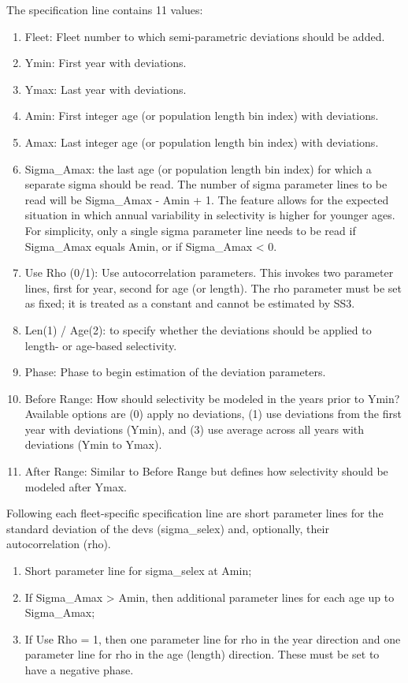 The specification line contains 11 values:
\begin{enumerate}
	\item Fleet: Fleet number to which semi-parametric deviations should be added.
	\item Ymin: First year with deviations.
	\item Ymax: Last year with deviations.
	\item Amin: First integer age (or population length bin index) with deviations.
	\item Amax: Last integer age (or population length bin index) with deviations.
	\item Sigma\_Amax: the last age (or population length bin index) for which a separate sigma should be read. The number of sigma parameter lines to be read will be Sigma\_Amax - Amin + 1. The feature allows for the expected situation in which annual variability in selectivity is higher for younger ages. For simplicity, only a single sigma parameter line needs to be read if Sigma\_Amax equals Amin, or if Sigma\_Amax < 0.
	\item Use Rho (0/1): Use autocorrelation parameters. This invokes two parameter lines, first for year, second for age (or length). The rho parameter must be set as fixed; it is treated as a constant and cannot be estimated by SS3.
	\item Len(1) / Age(2): to specify whether the deviations should be applied to length- or age-based selectivity.
	\item Phase: Phase to begin estimation of the deviation parameters.
	\item Before Range: How should selectivity be modeled in the years prior to Ymin? Available options are (0) apply no deviations, (1) use deviations from the first year with deviations (Ymin), and (3) use average across all years with deviations (Ymin to Ymax).
	\item After Range: Similar to Before Range but defines how selectivity should be modeled after Ymax.
\end{enumerate}

Following each fleet-specific specification line are short parameter lines for the standard deviation of the devs (sigma\_selex) and, optionally, their autocorrelation (rho).

\begin{enumerate}
	\item Short parameter line for sigma\_selex at Amin;
	\item If Sigma\_Amax > Amin, then additional parameter lines for each age up to Sigma\_Amax;
	\item If Use Rho = 1, then one parameter line for rho in the year direction and one parameter line for rho in the age (length) direction. These must be set to have a negative phase.
\end{enumerate}

